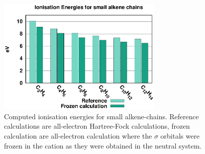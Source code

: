 \documentclass[aip]{revtex4-1}
\begin{document}
\begin{figure}
\begin{center}
\includegraphics[width=8cm]{froz_comp}
\end{center}
\caption{Computed ionisation energies for small alkene-chains. Reference calculations are all-electron Hartree-Fock calculations, frozen calculation 
are all-electron calculation where the $\sigma$ orbitals were frozen in the cation as they were obtained in the neutral system.}
\label{fig:froz_comp}
\end{figure}

%
\end{document}
